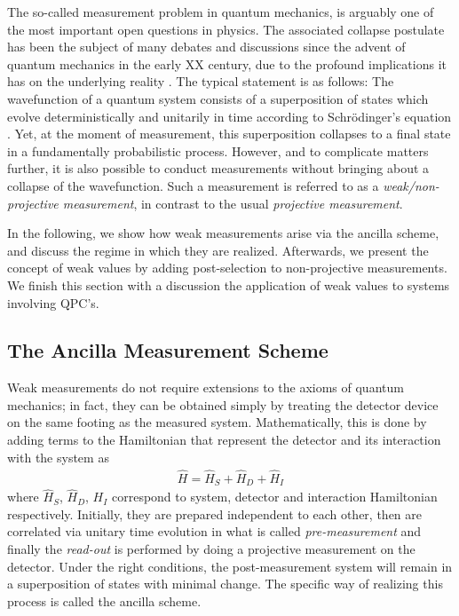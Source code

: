 \documentclass{article}
\begin{document}
The so-called measurement problem in quantum mechanics, is arguably one of the most important open questions
in physics. The associated collapse 
postulate has been the subject of many debates and discussions since the advent of quantum mechanics in the early XX century, 
due to the profound implications it has on the underlying reality \cite{bellsocks1981}. 
The typical statement is as follows: The
wavefunction of a quantum system consists of a 
superposition of states which evolve deterministically 
and unitarily in time according to Schrödinger's 
equation \cite{schrodingerQuantisierung1926,heisenbergUeberQuanten1985}. Yet, at the 
moment of measurement, this superposition collapses to a final state in a fundamentally 
probabilistic process. However, and to complicate
matters further, it is also possible to conduct measurements without bringing about 
a collapse of the wavefunction. Such a measurement is referred to as a \textit{weak/non-projective measurement}, in contrast to the usual \textit{projective measurement}.

In the following, we show how weak measurements arise via the ancilla scheme, and discuss the regime
in which they are realized. Afterwards, we present the concept of weak values by adding 
post-selection to non-projective measurements. We finish this 
section with a discussion the application of weak values to systems involving QPC's.

\subsection{The Ancilla Measurement Scheme}

Weak measurements do not require extensions to the axioms of quantum mechanics; in fact, they can be obtained simply by treating the detector device on the same footing as the measured system. Mathematically, this is done by adding terms to the Hamiltonian that represent the detector and its interaction with the system as 
\begin{align}
 \hat{H} = \hat{H}_S + \hat{H}_D + \hat{H}_{I}
\end{align}
where $\hat{H}_S $, $\hat{H}_D $, $ H_{I}$ correspond to system, detector and interaction Hamiltonian respectively. 
Initially, they are prepared independent to each other, then are correlated via unitary 
time evolution in what is called \textit{pre-measurement} and finally the \textit{read-out} is performed by doing a 
projective measurement on the detector. Under the right conditions, the post-measurement system will remain in
a superposition of states with minimal change.
The specific way of realizing this process is called
the ancilla scheme. 
\end{document}
